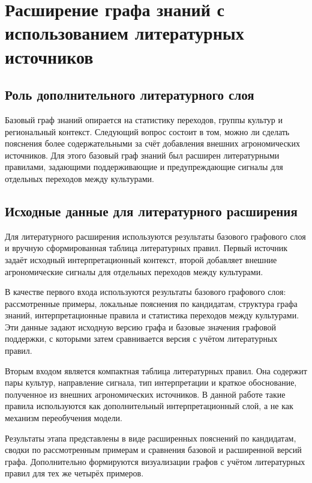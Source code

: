 \section{Расширение графа знаний с использованием литературных источников}

\subsection{Роль дополнительного литературного слоя}

Базовый граф знаний опирается на статистику переходов, группы культур и региональный контекст. Следующий вопрос
состоит в том, можно ли сделать пояснения более содержательными за счёт добавления внешних агрономических источников.
Для этого базовый граф знаний был расширен литературными правилами, задающими поддерживающие и предупреждающие сигналы
для отдельных переходов между культурами.

\subsection{Исходные данные для литературного расширения}

Для литературного расширения используются результаты базового графового слоя и вручную сформированная таблица
литературных правил. Первый источник задаёт исходный интерпретационный контекст, второй добавляет внешние
агрономические сигналы для отдельных переходов между культурами.

В качестве первого входа используются результаты базового графового слоя: рассмотренные примеры, локальные
пояснения по кандидатам, структура графа знаний, интерпретационные правила и статистика переходов между культурами.
Эти данные задают исходную версию графа и базовые значения графовой поддержки, с которыми затем сравнивается версия
с учётом литературных правил.

Вторым входом является компактная таблица литературных правил. Она содержит пары культур, направление сигнала, тип
интерпретации и краткое обоснование, полученное из внешних агрономических источников. В данной работе такие правила
используются как дополнительный интерпретационный слой, а не как механизм переобучения модели.

Результаты этапа представлены в виде расширенных пояснений по кандидатам, сводки по рассмотренным примерам и
сравнения базовой и расширенной версий графа. Дополнительно формируются визуализации графов с учётом литературных
правил для тех же четырёх примеров.

